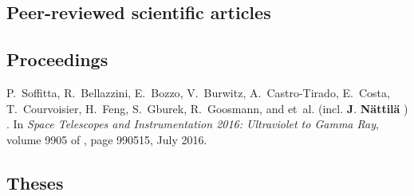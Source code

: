 \documentclass[10pt]{article}
\begin{document}
\subsection*{\phantom{sub} Peer-reviewed scientific articles}

\vspace{-20pt}
\renewcommand\refname{\phantom{bla}}



\nocite{*}


\subsection*{\phantom{sub} Proceedings}
\vspace{-20pt}
\begin{thebibliography}{1}
\vspace{-5pt}

P.~{Soffitta}, R.~{Bellazzini}, E.~{Bozzo}, V.~{Burwitz}, A.~{Castro-Tirado},
  E.~{Costa}, T.~{Courvoisier}, H.~{Feng}, S.~{Gburek}, R.~{Goosmann}, and
  et~al. (incl. \textbf{J}. \textbf{{N{\"a}ttil{\"a}}} )
.
\newblock In {\em Space Telescopes and Instrumentation 2016: Ultraviolet to
  Gamma Ray}, volume 9905 of {\em \procspie}, page 990515, July 2016.


\end{thebibliography}

\subsection*{\phantom{sub} Theses}
\end{document}
